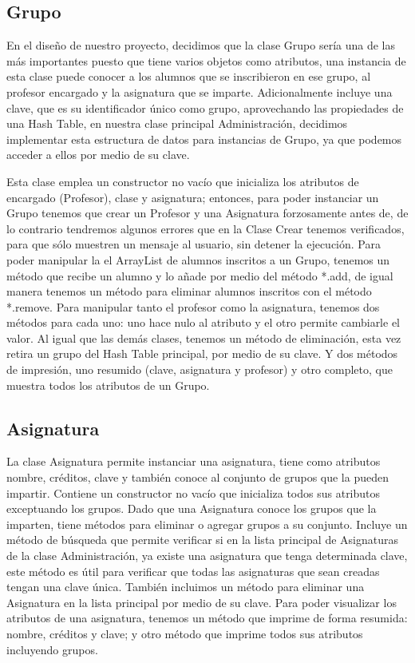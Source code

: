 \documentclass[11pt]{article}
\begin{document}
\subsection{Grupo}
\par

En el diseño de nuestro proyecto, decidimos que la clase Grupo sería una de las más importantes puesto que tiene varios objetos como atributos, una instancia de esta clase puede conocer a los alumnos que se inscribieron en ese grupo, al profesor encargado y la asignatura que se imparte. Adicionalmente incluye una clave, que es su identificador único como grupo, aprovechando las propiedades de una Hash Table, en nuestra clase principal Administración, decidimos implementar esta estructura de datos para instancias de Grupo, ya que podemos acceder a ellos por medio de su clave.
\par
Esta clase emplea un constructor no vacío que inicializa los atributos de encargado (Profesor), clase y asignatura; entonces, para poder instanciar un Grupo tenemos que crear un Profesor y una Asignatura forzosamente antes de, de lo contrario tendremos algunos errores que en la Clase Crear tenemos verificados, para que sólo muestren un mensaje al usuario, sin detener la ejecución.  Para poder manipular la el ArrayList de alumnos inscritos a un Grupo, tenemos un método que recibe un alumno y lo añade por medio del método *.add, de igual manera tenemos un método para eliminar alumnos inscritos con el método *.remove. Para manipular tanto el profesor como la asignatura, tenemos dos métodos para cada uno: uno hace nulo al atributo y el otro permite cambiarle el valor. Al igual que las demás clases, tenemos un método de eliminación, esta vez retira un grupo del Hash Table principal, por medio de su clave. Y dos métodos de impresión, uno resumido (clave, asignatura y profesor) y otro completo, que muestra todos los atributos de un Grupo.

\subsection{Asignatura}
\par

La clase Asignatura permite instanciar una asignatura, tiene como atributos nombre, créditos, clave y también conoce al conjunto de grupos que la pueden impartir. Contiene un constructor no vacío que inicializa todos sus atributos exceptuando los grupos. Dado que una Asignatura conoce los grupos que la imparten, tiene métodos para eliminar o agregar grupos a su conjunto. Incluye un método de búsqueda que permite verificar si en la lista principal de Asignaturas de la clase Administración, ya existe una asignatura que tenga determinada clave, este método es útil para verificar que todas las asignaturas que sean creadas tengan una clave única. También incluimos un método para eliminar una Asignatura en la lista principal por medio de su clave. Para poder visualizar los atributos de una asignatura, tenemos un método que imprime de forma resumida: nombre, créditos y clave; y otro método que imprime todos sus atributos incluyendo grupos.
\end{document}

